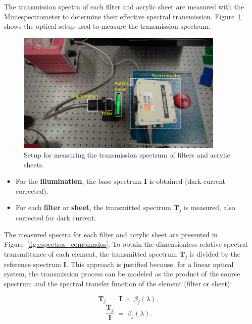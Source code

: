 The transmission spectra of each filter and acrylic sheet are measured with the Miniespectrometer to determine their effective spectral transmission. Figure~\ref{fig:montaje_spec} shows the optical setup used to measure the transmission spectrum.

\begin{figure}[H]
    \centering
    \includegraphics[trim=30mm 0mm 40mm 25mm, clip, width=0.9\textwidth]{Figures/C3/montaje_spec.pdf}
    \caption{Setup for measuring the transmission spectrum of filters and acrylic sheets.}
    \label{fig:montaje_spec}
\end{figure}

\begin{itemize}
    \item For the \textbf{illumination}, the base spectrum \(\mathbf{I}\) is obtained (dark-current corrected).
    \item For each \textbf{filter} or \textbf{sheet}, the transmitted spectrum \(\mathbf{T}_j\) is measured, also corrected for dark current.
\end{itemize}

\noindent The measured spectra for each filter and acrylic sheet are presented in Figure~\ref{fig:espectros_combinados}. To obtain the dimensionless relative spectral transmittance of each element, the transmitted spectrum \(\mathbf{T}_j\) is divided by the reference spectrum \(\mathbf{I}\). This approach is justified because, for a linear optical system, the transmission process can be modeled as the product of the source spectrum and the spectral transfer function of the element (filter or sheet):

\begin{equation}
    \mathbf{T}_j \;=\; \mathbf{I} \;\times\; \beta_j(\lambda),
\end{equation}
\begin{equation}
    \frac{\mathbf{T}_j}{\mathbf{I}} \;=\; \beta_j(\lambda).
\end{equation}

